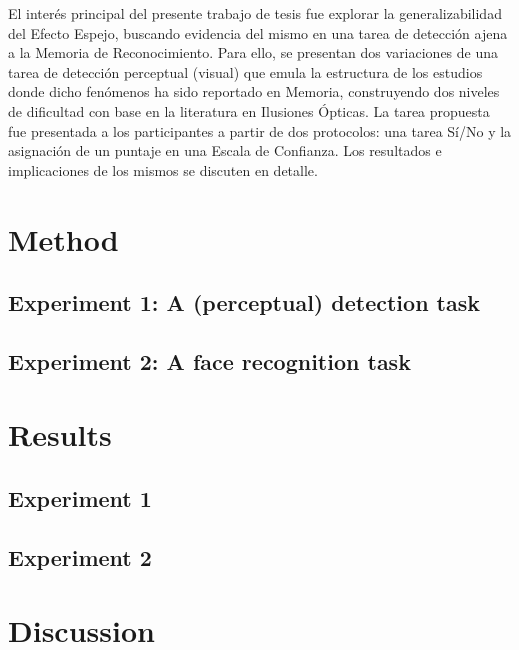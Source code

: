 \documentclass[jou,apacite]{apa6}
\begin{document}
El interés principal del presente trabajo de tesis fue explorar la generalizabilidad del Efecto Espejo, buscando evidencia del mismo en una tarea de detección ajena a la Memoria de Reconocimiento. Para ello, se presentan dos variaciones de una tarea de detección perceptual (visual) que emula la estructura de los estudios donde dicho fenómenos ha sido reportado en Memoria, construyendo dos niveles de dificultad con base en la literatura en Ilusiones Ópticas. La tarea propuesta fue presentada a los participantes a partir de dos protocolos: una tarea Sí/No y la asignación de un puntaje en una Escala de Confianza. Los resultados e implicaciones de los mismos se discuten en detalle.\\


\section{Method}

\subsection{Experiment 1: A (perceptual) detection task}

\subsection{Experiment 2: A face recognition task}

\section{Results}

\subsection{Experiment 1}

\subsection{Experiment 2}

\section{Discussion}
\end{document}
